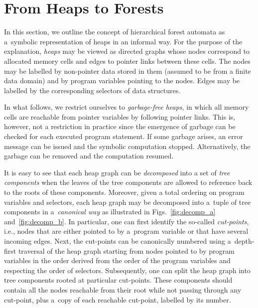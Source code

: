\section{From Heaps to Forests}\label{sec:heaps2forests}

In this section, we outline the concept of hierarchical
forest automata as a~symbolic representation of heaps in an informal way. For
the purpose of the explanation, \emph{heaps} may be viewed as directed graphs
whose nodes correspond to allocated memory cells and edges to pointer links
between these cells. The nodes may be labelled by non-pointer data stored in
them (assumed to be from a finite data domain) and by program variables pointing
to the nodes. Edges may be labelled by the corresponding selectors of data
structures.

In what follows, we restrict ourselves to \emph{garbage-free heaps}, in which all
memory cells are reachable from pointer variables by following pointer links.
This is, however, not a restriction in practice since the emergence of garbage
can be checked for each executed program statement. If some garbage arises, an
error message can be issued and the symbolic computation stopped. Alternatively, the
garbage can be removed and the computation resumed.

It is easy to see that each heap graph can be \emph{decomposed} into a set of
\emph{tree components} when the leaves of the tree components are allowed to
reference back to the roots of these components. Moreover, given a total
ordering on program variables and selectors, each heap graph may be decomposed
into a~tuple of tree components in a~\emph{canonical way} as illustrated in
Figs.~\ref{fig:decomp_a} and~\ref{fig:decomp_b}. In particular, one can first identify
the so-called \emph{cut-points}, i.e., nodes that are either pointed to by
a~program variable or that have several incoming edges. Next, the cut-points can
be canonically numbered using a~depth-first traversal of the heap graph starting
from nodes pointed to by program variables in the order derived from the order
of the program variables and respecting the order of selectors. Subsequently,
one can split the heap graph into tree components rooted at particular
cut-points. These components should contain all the nodes reachable from their
root while not passing through any cut-point, plus a~copy of each reachable
cut-point, labelled by its number. 


